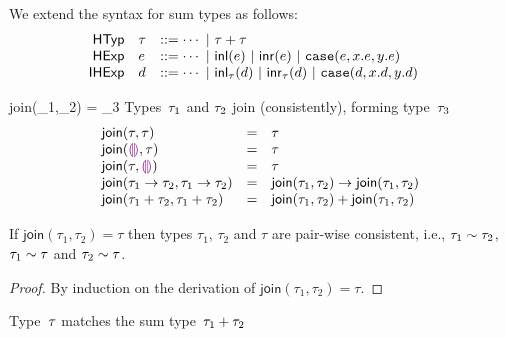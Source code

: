 We extend the syntax for sum types as follows:
\[
\begin{array}{rllllll}
\mathsf{HTyp} & \tau & ::= \cdots ~\vert~ {\tau + \tau} &
\\
\mathsf{HExp} & e & ::= \cdots
~\vert~ \mathsf{inl}(e)
~\vert~ \mathsf{inr}(e)
~\vert~ \texttt{case}({e},{x}.{e},{y}.{e})
\\
\mathsf{IHExp} & d & ::= \cdots
~\vert~ \mathsf{inl}_{\tau}(d)
~\vert~ \mathsf{inr}_{\tau}(d)
~\vert~ \texttt{case}({d},{x}.{d},{y}.{d})
\end{array}
\]


\newcommand{\JoinTypes}[2]{\textsf{join}(#1,#2)}

\judgbox
 {\JoinTypes{\htau_1}{\htau_2} = \htau_3}
 {Types~$\tau_1$ and $\tau_2$ join (consistently), forming type~$\tau_3$}
\[
\begin{array}{lcl}
\JoinTypes{\htau}{\htau} &=&  \htau
\\
\JoinTypes{\tehole}{\htau} &=&  \htau
\\
\JoinTypes{\htau}{\tehole} &=&  \htau
\\
\JoinTypes
{\tarr{\htau_1}{\htau_2}}
{\tarr{\htau_1}{\htau_2}}
&=&
\tarr{\JoinTypes{\htau_1}{\htau_2}}
     {\JoinTypes{\htau_1}{\htau_2}}
\\
\JoinTypes
{\tsum{\htau_1}{\htau_2}}
{\tsum{\htau_1}{\htau_2}}
&=&
\tsum{\JoinTypes{\htau_1}{\htau_2}}
     {\JoinTypes{\htau_1}{\htau_2}}
\end{array}
\]

\begin{thm}[Joins]
If $\JoinTypes{\tau_1}{\tau_2} = \tau$ 
%
then types $\tau_1$, $\tau_2$ and $\tau$ are pair-wise consistent, i.e.,
%
$\tau_1 \sim \tau_2$, 
$\tau_1 \sim \tau$ and 
$\tau_2 \sim \tau$.
\begin{proof}
By induction on the derivation of $\JoinTypes{\tau_1}{\tau_2} = \tau$.
\end{proof}
\end{thm}

\vspace*{5mm}

\judgbox
 {}
 {Type~$\tau$ matches the sum type~${\tau_1} + {\tau_2}$}

